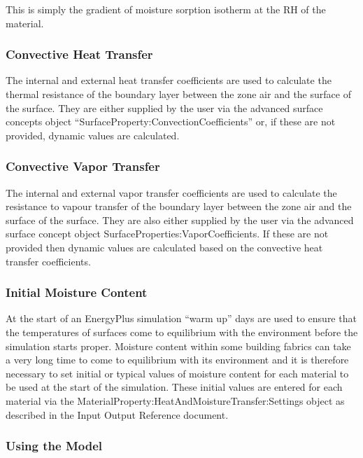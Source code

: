 This is simply the gradient of moisture sorption isotherm at the RH of the material.

\subsubsection{Convective Heat Transfer}\label{convective-heat-transfer}

The internal and external heat transfer coefficients are used to calculate the thermal resistance of the boundary layer between the zone air and the surface of the surface. They are either supplied by the user via the advanced surface concepts object ``SurfaceProperty:ConvectionCoefficients'' or, if these are not provided, dynamic values are calculated.

\subsubsection{Convective Vapor Transfer}\label{convective-vapor-transfer}

The internal and external vapor transfer coefficients are used to calculate the resistance to vapour transfer of the boundary layer between the zone air and the surface of the surface. They are also either supplied by the user via the advanced surface concept object SurfaceProperties:VaporCoefficients. If these are not provided then dynamic values are calculated based on the convective heat transfer coefficients.

\subsubsection{Initial Moisture Content}\label{initial-moisture-content}

At the start of an EnergyPlus simulation ``warm up'' days are used to ensure that the temperatures of surfaces come to equilibrium with the environment before the simulation starts proper. Moisture content within some building fabrics can take a very long time to come to equilibrium with its environment and it is therefore necessary to set initial or typical values of moisture content for each material to be used at the start of the simulation. These initial values are entered for each material via the MaterialProperty:HeatAndMoistureTransfer:Settings object as described in the Input Output Reference document.

\subsubsection{Using the Model}\label{using-the-model}

